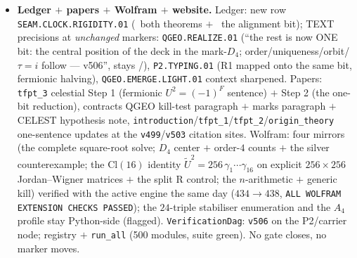 \begin{itemize}[leftmargin=1.5em]
$\mathrm{Cl}(16)$): $\tilde U=\prod_j(1-\gamma_j\gamma_{j+8})$ implements the deck on all $16$
generators and $\tilde U^2=256\,\gamma_1\cdots\gamma_{16}$ $\Rightarrow$ $U^2=(-1)^F$ EXACTLY;
$(cU)^2=c^2(-1)^F$ is \emph{never} $1$ (center of $\mathrm{Cl}(16)$ $=$ scalars): the $\Z_4$ lift
is FORCED, $1\to\Z_2^{(-1)^F}\to\Z_4\to\Z_2^{\mathrm{deck}}\to1$ nonsplit; the quarter-shift lift
$V$ (unique even block implementer) has $V^2\propto\tilde U$, $V^4\propto(-1)^F$, projective order
$8=2|\mu_4|$ --- the \texttt{v492} $\Z_8$ spin bridge realised on the $16$-Majorana Fock space;
R control $U_R^2=+1$ (split --- the forcing rests on NS $=$ established geometry); $16$-fold way
$\theta_v=1$ at $\nu=16$; robustness: the forcing already holds at $8$ sites ($16$ $=$ the carrier
count $2^{\gcar-1}$, not a tuning). \emph{The one \mC\ rest (verbatim)}: ``the collar deck is the
central involution of the mark-$D_4$'' ($\iff$ square-root existence on the mark data) --- ONE
alignment bit; the fermionic $\Z_4$ forces the ORDER, not the spatial alignment. No overclaim.
\item \textbf{Ledger $+$ papers $+$ Wolfram $+$ website.} Ledger: new row
\texttt{SEAM.CLOCK.RIGIDITY.01} (\mE\ both theorems $+$ \mC\ the alignment bit); TEXT precisions at
\emph{unchanged} markers: \texttt{QGEO.REALIZE.01} (``the rest is now ONE bit: the central position
of the deck in the mark-$D_4$; order/uniqueness/orbit/$\tau{=}i$ follow --- v506'', stays \mC/\mO),
\texttt{P2.TYPING.01} (R1 mapped onto the same bit, fermionic halving), \texttt{QGEO.EMERGE.LIGHT.01}
context sharpened. Papers: \texttt{tfpt\_3} celestial Step 1 (fermionic $U^2=(-1)^F$ sentence) $+$
Step 2 (the one-bit reduction), contracts QGEO kill-test paragraph $+$ marks paragraph $+$ CELEST
hypothesis note, \texttt{introduction}/\texttt{tfpt\_1}/\texttt{tfpt\_2}/\texttt{origin\_theory}
one-sentence updates at the \texttt{v499}/\texttt{v503} citation sites. Wolfram: four mirrors (the
complete square-root solve; $D_4$ center $+$ order-$4$ counts $+$ the silver counterexample; the
$\mathrm{Cl}(16)$ identity $\tilde U^2=256\,\gamma_1\cdots\gamma_{16}$ on explicit $256{\times}256$
Jordan--Wigner matrices $+$ the split R control; the $n$-arithmetic $+$ generic kill) verified with
the active engine the same day ($434\to438$, \texttt{ALL WOLFRAM EXTENSION CHECKS PASSED}); the
$24$-triple stabiliser enumeration and the $A_4$ profile stay Python-side (flagged).
\texttt{VerificationDag}: \texttt{v506} on the P2/carrier node; registry $+$ \texttt{run\_all}
(500 modules, suite green). No gate closes, no marker moves.
\end{itemize}

